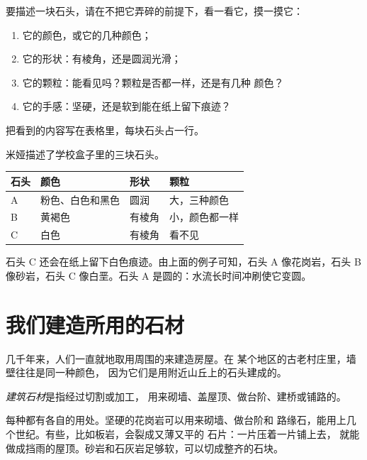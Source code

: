 \begin{method}[仔细观察一块石头]\label{met:g3:stones-pebbles-sand:look}
要描述一块石头，请在不把它弄碎的前提下，看一看它，摸一摸它：
\begin{enumerate}
  \item 它的颜色，或它的几种颜色；
  \item 它的形状：有棱角，还是圆润光滑；
  \item 它的颗粒：能看见吗？颗粒是否都一样，还是有几种
        颜色？
  \item 它的手感：坚硬，还是软到能在纸上留下痕迹？
\end{enumerate}
把看到的内容写在表格里，每块石头占一行。
\end{method}

\begin{example}[三块石头的表格]\label{ex:g3:stones-pebbles-sand:table}
米娅描述了学校盒子里的三块石头。
\begin{center}\small
\begin{tabular}{llll}
\hline
石头 & 颜色 & 形状 & 颗粒 \\
\hline
A & 粉色、白色和黑色 & 圆润 & 大，三种颜色 \\
B & 黄褐色 & 有棱角 & 小，颜色都一样 \\
C & 白色 & 有棱角 & 看不见 \\
\hline
\end{tabular}
\end{center}
石头 C 还会在纸上留下白色痕迹。由上面的例子可知，石头 A
像花岗岩，石头 B 像砂岩，石头 C 像白垩。石头 A
是圆的：水流长时间冲刷使它变圆。
\end{example}

\section{我们建造所用的石材}

几千年来，人们一直就地取用周围的来建造房屋。在
某个地区的古老村庄里，墙壁往往是同一种颜色，
因为它们是用附近山丘上的石头建成的。

\begin{definition}[建筑石材]\label{def:g3:stones-pebbles-sand:building-stone}
\emph{建筑石材}是指经过切割或加工，
用来砌墙、盖屋顶、做台阶、建桥或铺路的。
\end{definition}

每种都有各自的用处。坚硬的花岗岩可以用来砌墙、做台阶和
路缘石，能用上几个世纪。有些，比如板岩，会裂成又薄又平的
石片：一片压着一片铺上去，
就能做成挡雨的屋顶。砂岩和石灰岩足够软，可以切成整齐的石块。

